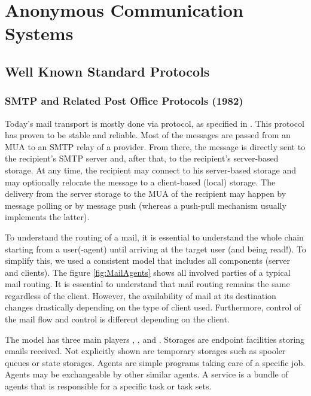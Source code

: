 
\part{Anonymous Communication Systems}\label{sec:systems}
\chapter{Well Known Standard Protocols}
\section*{SMTP and Related Post Office Protocols (1982)}\label{sec:mailTransport}
Today's mail transport is mostly done via  protocol, as specified in \cite{rfc5321}. This protocol has proven to be stable and reliable. Most of the messages are passed from an MUA to an SMTP relay of a provider. From there, the message is directly sent to the recipient's SMTP server and, after that, to the recipient's server-based storage. At any time, the recipient may connect to his server-based storage and may optionally relocate the message to a client-based (local) storage. The delivery from the server storage to the MUA of the recipient may happen by message polling or by message push (whereas a push-pull mechanism usually implements the latter).

To understand the routing of a mail, it is essential to understand the whole chain starting from a user(-agent) until arriving at the target user (and being read!). To simplify this, we used a consistent model that includes all components (server and clients). The figure \ref{fig:MailAgents} shows all involved parties of a typical mail routing. It is essential to understand that mail routing remains the same regardless of the client. However, the availability of mail at its destination changes drastically depending on the type of client used. Furthermore, control of the mail flow and control is different depending on the client.

The model has three main players , , and . Storages are endpoint facilities storing emails received. Not explicitly shown are temporary storages such as spooler queues or state storages. Agents are simple programs taking care of a specific job. Agents may be exchangeable by other similar agents. A service is a bundle of agents that is responsible for a specific task or task sets.

